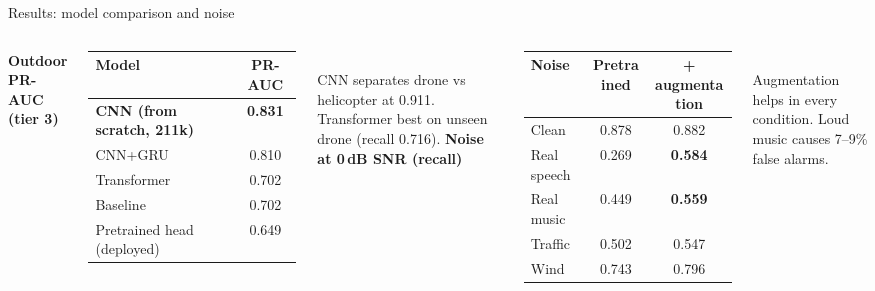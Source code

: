 \documentclass[aspectratio=169,11pt]{beamer}
\begin{document}
\begin{frame}{Results: model comparison and noise}
\begin{columns}[T]
\textbf{Outdoor PR-AUC (tier 3)}\\[2pt]
\small
\begin{tabular}{@{}lc@{}}
\toprule
Model & PR-AUC \\
\midrule
\textbf{CNN (from scratch, 211k)} & \textbf{0.831} \\
CNN+GRU & 0.810 \\
Transformer & 0.702 \\
Baseline & 0.702 \\
Pretrained head (deployed) & 0.649 \\
\bottomrule
\end{tabular}\\[4pt]
\footnotesize CNN separates drone vs helicopter at 0.911. Transformer best on unseen drone (recall 0.716).
\textbf{Noise at 0\,dB SNR (recall)}\\[2pt]
\footnotesize
\begin{tabular}{@{}lcc@{}}
\toprule
Noise & Pretrained & + augmentation \\
\midrule
Clean & 0.878 & 0.882 \\
Real speech & 0.269 & \textbf{0.584} \\
Real music & 0.449 & \textbf{0.559} \\
Traffic & 0.502 & 0.547 \\
Wind & 0.743 & 0.796 \\
\bottomrule
\end{tabular}\\[4pt]
Augmentation helps in every condition. Loud music causes 7--9\% false alarms.
\end{columns}
\end{frame}
\end{document}
